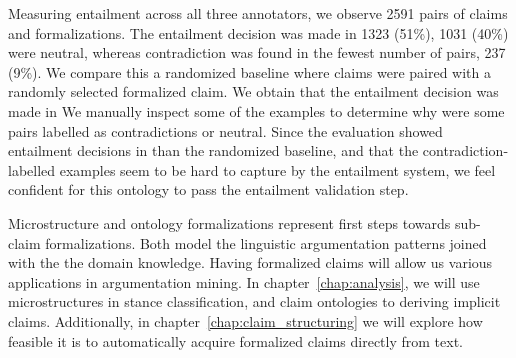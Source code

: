 Measuring entailment across all three annotators, we observe 2591 pairs of claims
and formalizations. The entailment decision was made in 1323 (51\%), 1031 (40\%)
were neutral, whereas contradiction was found in the fewest number of pairs, 
237 (9\%). We compare this a randomized baseline where claims were 
paired with a randomly selected formalized claim. 
We obtain that the entailment decision was made in 
We manually inspect some of the examples to determine why were some 
pairs labelled as contradictions or neutral. 
Since the evaluation showed entailment decisions in 
than the randomized baseline, and that the contradiction-labelled examples 
seem to be hard to capture by the entailment system, we feel confident for this ontology
to pass the entailment validation step. 

% 

Microstructure and ontology formalizations represent first steps towards
sub-claim formalizations. Both model the linguistic argumentation patterns
joined with the the domain knowledge.  Having formalized claims will allow us
various applications in argumentation mining. In chapter~\ref{chap:analysis},
we will use microstructures in stance classification, and claim ontologies to
deriving implicit claims.  Additionally, in
chapter~\ref{chap:claim_structuring} we will explore how feasible it is to
automatically acquire formalized claims directly from text.  
